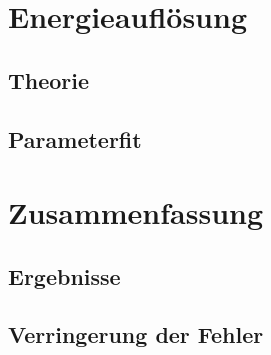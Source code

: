 \documentclass{../Misc/MontavonLaTeX/Montavon}
\begin{document}
\section{Energieauflösung}
\subsection{Theorie}

\subsection{Parameterfit}

\section{Zusammenfassung}
\subsection{Ergebnisse}

\subsection{Verringerung der Fehler}
\end{document}
